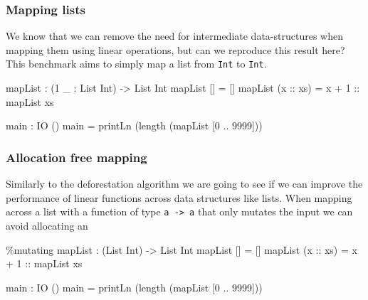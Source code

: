 \documentclass[
]{article}
\newenvironment{Shaded}{}{}
\newcommand{\DataTypeTok}[1]{\textcolor[rgb]{0.56,0.13,0.00}{#1}}
\newcommand{\DecValTok}[1]{\textcolor[rgb]{0.25,0.63,0.44}{#1}}
\newcommand{\FunctionTok}[1]{\textcolor[rgb]{0.02,0.16,0.49}{#1}}
\newcommand{\NormalTok}[1]{#1}
\newcommand{\OperatorTok}[1]{\textcolor[rgb]{0.40,0.40,0.40}{#1}}
\newcommand{\OtherTok}[1]{\textcolor[rgb]{0.00,0.44,0.13}{#1}}
\begin{document}
\hypertarget{mapping-lists}{%
\subsubsection{Mapping lists}\label{mapping-lists}}

We know that we can remove the need for intermediate data-structures
when mapping them using linear operations\cite{deforestation}, but can
we reproduce this result here? This benchmark aims to simply map a list
from \texttt{Int} to \texttt{Int}.

\begin{Shaded}
\begin{Highlighting}[]
\NormalTok{mapList }\OperatorTok{:}\NormalTok{ (}\DecValTok{1}\NormalTok{ \_ }\OperatorTok{:} \DataTypeTok{List} \DataTypeTok{Int}\NormalTok{) }\OtherTok{{-}\textgreater{}} \DataTypeTok{List} \DataTypeTok{Int}
\NormalTok{mapList [] }\OtherTok{=}\NormalTok{ []}
\NormalTok{mapList (}\OtherTok{x ::}\NormalTok{ xs) }\OtherTok{=}\NormalTok{ x }\OperatorTok{+} \DecValTok{1}\OtherTok{ ::}\NormalTok{ mapList xs}

\NormalTok{main }\OperatorTok{:} \DataTypeTok{IO}\NormalTok{ ()}
\NormalTok{main }\OtherTok{=}\NormalTok{ printLn (}\FunctionTok{length}\NormalTok{ (mapList [}\DecValTok{0} \OperatorTok{..} \DecValTok{9999}\NormalTok{]))}
\end{Highlighting}
\end{Shaded}

\hypertarget{allocation-free-mapping}{%
\subsubsection{Allocation free mapping}\label{allocation-free-mapping}}

Similarly to the deforestation algorithm we are going to see if we can
improve the performance of linear functions across data structures like
lists. When mapping across a list with a function of type
\texttt{a\ -\textgreater{}\ a} that only mutates the input we can avoid
allocating an

\begin{Shaded}
\begin{Highlighting}[]
\OperatorTok{\%}\NormalTok{mutating}
\NormalTok{mapList }\OperatorTok{:}\NormalTok{ (}\DataTypeTok{List} \DataTypeTok{Int}\NormalTok{) }\OtherTok{{-}\textgreater{}} \DataTypeTok{List} \DataTypeTok{Int}
\NormalTok{mapList [] }\OtherTok{=}\NormalTok{ []}
\NormalTok{mapList (}\OtherTok{x ::}\NormalTok{ xs) }\OtherTok{=}\NormalTok{ x }\OperatorTok{+} \DecValTok{1}\OtherTok{ ::}\NormalTok{ mapList xs}

\NormalTok{main }\OperatorTok{:} \DataTypeTok{IO}\NormalTok{ ()}
\NormalTok{main }\OtherTok{=}\NormalTok{ printLn (}\FunctionTok{length}\NormalTok{ (mapList [}\DecValTok{0} \OperatorTok{..} \DecValTok{9999}\NormalTok{]))}
\end{Highlighting}
\end{Shaded}
\end{document}
